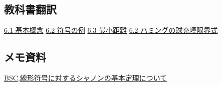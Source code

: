 \documentclass[12pt,a4paper]{article}
\begin{document}
\subsection*{教科書翻訳}\label{ux6559ux79d1ux66f8ux7ffbux8a33}

\href{./intro.pdf}{6.1 基本概念}
\href{./code_examples.pdf}{6.2 符号の例}
\href{./minimum_distance.pdf}{6.3 最小距離}
\href{./hammings_sphere-packing-bound.pdf}{6.2 ハミングの球充填限界式}

\subsection*{メモ資料}\label{ux30e1ux30e2ux8cc7ux6599}

\href{./BSC.pdf}{BSC,線形符号に対するシャノンの基本定理について}
\end{document}
